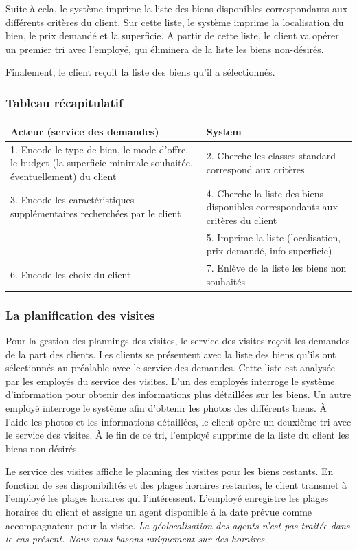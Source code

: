 Suite à cela, le système imprime la liste des biens disponibles correspondants aux différents critères du client.
Sur cette liste, le système imprime  la localisation du bien, le prix demandé et la superficie.
A partir de cette liste, le client va opérer un premier tri avec l'employé, qui éliminera de la liste les biens non-désirés.

Finalement, le client reçoit la liste des biens qu'il a sélectionnés.

\subsubsection*{Tableau récapitulatif}
\begin{longtable}{|p{7.5cm}|p{7.5cm}|}
\hline
Acteur (service des demandes)& System\\
\hline
1. Encode le type de bien, le mode d'offre, le budget (la superficie minimale souhaitée, éventuellement) du client & 2. Cherche les classes standard correspond aux critères\\
3. Encode les caractéristiques supplémentaires recherchées par le client & 4. Cherche la liste des biens disponibles correspondants aux critères du client\\
& 5. Imprime la liste (localisation, prix demandé, info superficie)\\
6. Encode les choix du client & 7. Enlève de la liste les biens non souhaités\\
\hline
\end{longtable}

\subsubsection{La planification des visites}
Pour la gestion des plannings des visites, le service des visites reçoit les demandes de la part des clients.
Les clients se présentent avec la liste des biens qu'ils ont sélectionnés au préalable avec le service des demandes.
Cette liste est analysée par les employés du service des visites. L'un des employés interroge le système d'information pour obtenir des informations plus détaillées sur les biens. Un autre employé interroge le système afin d'obtenir les photos des différents biens.
À l'aide les photos et les informations détaillées, le client opère un deuxième tri avec le service des visites. À le fin de ce tri, l'employé supprime de la liste du client les biens non-désirés.

Le service des visites affiche le planning des visites pour les biens restants.
En fonction de ses disponibilités et des plages horaires restantes, le client transmet à l'employé les plages horaires qui l'intéressent. L'employé enregistre les plages horaires du client et assigne un agent disponible à la date prévue comme accompagnateur pour la visite.
\emph{La géolocalisation des agents n'est pas traitée dans le cas présent. Nous nous basons uniquement sur des horaires.}

